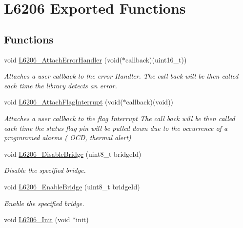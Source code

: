 \hypertarget{group___l6206___exported___functions}{}\section{L6206 Exported Functions}
\label{group___l6206___exported___functions}
\subsection*{Functions}
\begin{DoxyCompactItemize}
\item 
void \mbox{\hyperlink{group___l6206___exported___functions_ga297db3a8467d60c474207228f8db4239}{L6206\+\_\+\+Attach\+Error\+Handler}} (void($\ast$callback)(uint16\+\_\+t))
\begin{DoxyCompactList}\small\item\em Attaches a user callback to the error Handler. The call back will be then called each time the library detects an error. \end{DoxyCompactList}\item 
void \mbox{\hyperlink{group___l6206___exported___functions_ga12328adaf12eddaa6c0a8b8f27960bb2}{L6206\+\_\+\+Attach\+Flag\+Interrupt}} (void($\ast$callback)(void))
\begin{DoxyCompactList}\small\item\em Attaches a user callback to the flag Interrupt The call back will be then called each time the status flag pin will be pulled down due to the occurrence of a programmed alarms ( O\+CD, thermal alert) \end{DoxyCompactList}\item 
void \mbox{\hyperlink{group___l6206___exported___functions_gaa04c656bbd75fae03f79fadad19c1c15}{L6206\+\_\+\+Disable\+Bridge}} (uint8\+\_\+t bridge\+Id)
\begin{DoxyCompactList}\small\item\em Disable the specified bridge. \end{DoxyCompactList}\item 
void \mbox{\hyperlink{group___l6206___exported___functions_gab167a69ec9bbfdee8a66dab0104bde03}{L6206\+\_\+\+Enable\+Bridge}} (uint8\+\_\+t bridge\+Id)
\begin{DoxyCompactList}\small\item\em Enable the specified bridge. \end{DoxyCompactList}\item 
void \mbox{\hyperlink{group___l6206___exported___functions_gadc30fab492fa25e27e9d2d98ba2a63a4}{L6206\+\_\+\+Init}} (void $\ast$init)

\end{DoxyCompactItemize}
